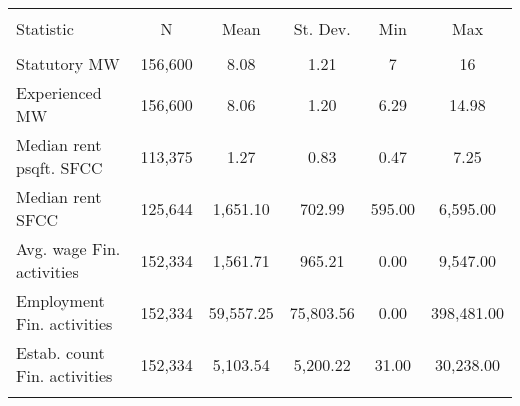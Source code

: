 
\begin{tabular}{@{\extracolsep{5pt}}lccccc} 
\\[-1.8ex]\hline 
\hline \\[-1.8ex] 
Statistic & \multicolumn{1}{c}{N} & \multicolumn{1}{c}{Mean} & \multicolumn{1}{c}{St. Dev.} & \multicolumn{1}{c}{Min} & \multicolumn{1}{c}{Max} \\ 
\hline \\[-1.8ex] 
Statutory MW & 156,600 & 8.08 & 1.21 & 7 & 16 \\ 
Experienced MW & 156,600 & 8.06 & 1.20 & 6.29 & 14.98 \\ 
Median rent psqft. SFCC & 113,375 & 1.27 & 0.83 & 0.47 & 7.25 \\ 
Median rent SFCC & 125,644 & 1,651.10 & 702.99 & 595.00 & 6,595.00 \\ 
Avg. wage Fin. activities & 152,334 & 1,561.71 & 965.21 & 0.00 & 9,547.00 \\ 
Employment Fin. activities & 152,334 & 59,557.25 & 75,803.56 & 0.00 & 398,481.00 \\ 
Estab. count Fin. activities & 152,334 & 5,103.54 & 5,200.22 & 31.00 & 30,238.00 \\ 
\hline \\[-1.8ex] 
\end{tabular} 
